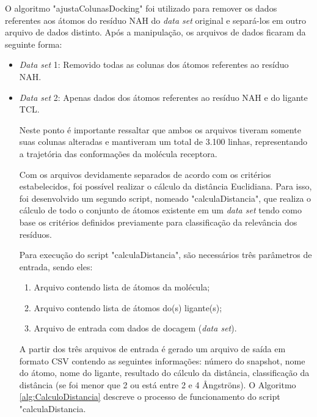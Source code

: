 O algoritmo "ajustaColunasDocking" foi utilizado para remover os dados referentes aos átomos do resíduo NAH do \emph{data set} original e separá-los em outro arquivo de dados distinto. Após a manipulação, os arquivos de dados ficaram da seguinte forma:
\begin{itemize}
	\item \emph{Data set} 1: Removido todas as colunas dos átomos referentes ao resíduo NAH.
	\item \emph{Data set} 2: Apenas dados dos átomos referentes ao resíduo NAH e do ligante TCL.

Neste ponto é importante ressaltar que ambos os arquivos tiveram somente suas colunas alteradas e mantiveram um total de 3.100 linhas, representando a trajetória das conformações da molécula receptora.

Com os arquivos devidamente separados de acordo com os critérios estabelecidos, foi possível realizar o cálculo da distância Euclidiana. Para isso, foi desenvolvido um segundo script, nomeado "calculaDistancia", que realiza o cálculo de todo o conjunto de átomos existente em um \emph{data set} tendo como base os critérios definidos previamente para classificação da relevância dos resíduos.

Para execução do script "calculaDistancia", são necessários três parâmetros de entrada, sendo eles:
\begin{enumerate}
	\item Arquivo contendo lista de átomos da molécula;
	\item Arquivo contendo lista de átomos do(s) ligante(s);
	\item Arquivo de entrada com dados de docagem (\emph{data set}).
\end{enumerate}

% 
%
%       

A partir dos três arquivos de entrada é gerado um arquivo de saída em formato CSV contendo as seguintes informações: número do snapshot, nome do átomo, nome do ligante, resultado do cálculo da distância, classificação da distância (se foi menor que 2 ou está entre 2 e 4 {\AA}ngstr\"ons). O Algoritmo \ref{alg:CalculoDistancia} descreve o processo de funcionamento do script "calculaDistancia.


\end{itemize}
